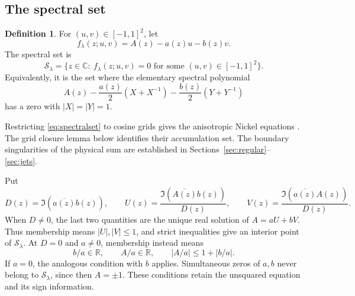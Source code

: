 \documentclass[11pt]{article}
\numberwithin{equation}{section}
\theoremstyle{definition}
\newtheorem{definition}[theorem]{Definition}
\newcommand{\C}{\mathbb C}
\newcommand{\R}{\mathbb R}
\newcommand{\cS}{\mathcal S}
\begin{document}
\subsection{The spectral set}

\begin{definition}\label{def:spectralset}
For \((u,v)\in[-1,1]^2\), let
\[
 f_\lambda(z;u,v)=A(z)-a(z)u-b(z)v.
\]
The spectral set is
\begin{equation}\label{eq:spectralset}
 \cS_\lambda
 =\{z\in\C:\ f_\lambda(z;u,v)=0
                    \text{ for some }(u,v)\in[-1,1]^2\}.
\end{equation}
Equivalently, it is the set where the elementary spectral polynomial
\[
 A(z)-\frac{a(z)}2(X+X^{-1})
       -\frac{b(z)}2(Y+Y^{-1})
\]
has a zero with \(|X|=|Y|=1\).
\end{definition}

Restricting \eqref{eq:spectralset} to cosine grids gives the
anisotropic Nickel equations \cite[eq.~(54)]{BHM}. The grid closure
lemma below identifies their accumulation set. The boundary
singularities of the physical sum are established in
Sections~\ref{sec:regular}--\ref{sec:jets}.

Put
\begin{equation}\label{eq:cramerUV}
 D(z)=\Im(\overline{a(z)}b(z)),\qquad
 U(z)=\frac{\Im(\overline{A(z)}b(z))}{D(z)},\qquad
 V(z)=\frac{\Im(\overline{a(z)}A(z))}{D(z)}.
\end{equation}
When \(D\ne0\), the last two quantities are the unique real solution
of \(A=aU+bV\). Thus membership means \(|U|,|V|\le1\), and strict
inequalities give an interior point of \(\cS_\lambda\). At \(D=0\)
and \(a\ne0\), membership instead means
\[
 b/a\in\R,\qquad A/a\in\R,\qquad |A/a|\le1+|b/a|.
\]
If \(a=0\), the analogous condition with \(b\) applies. Simultaneous
zeros of \(a,b\) never belong to \(\cS_\lambda\), since then
\(A=\pm1\). These conditions retain the unsquared equation and its
sign information.
\end{document}
